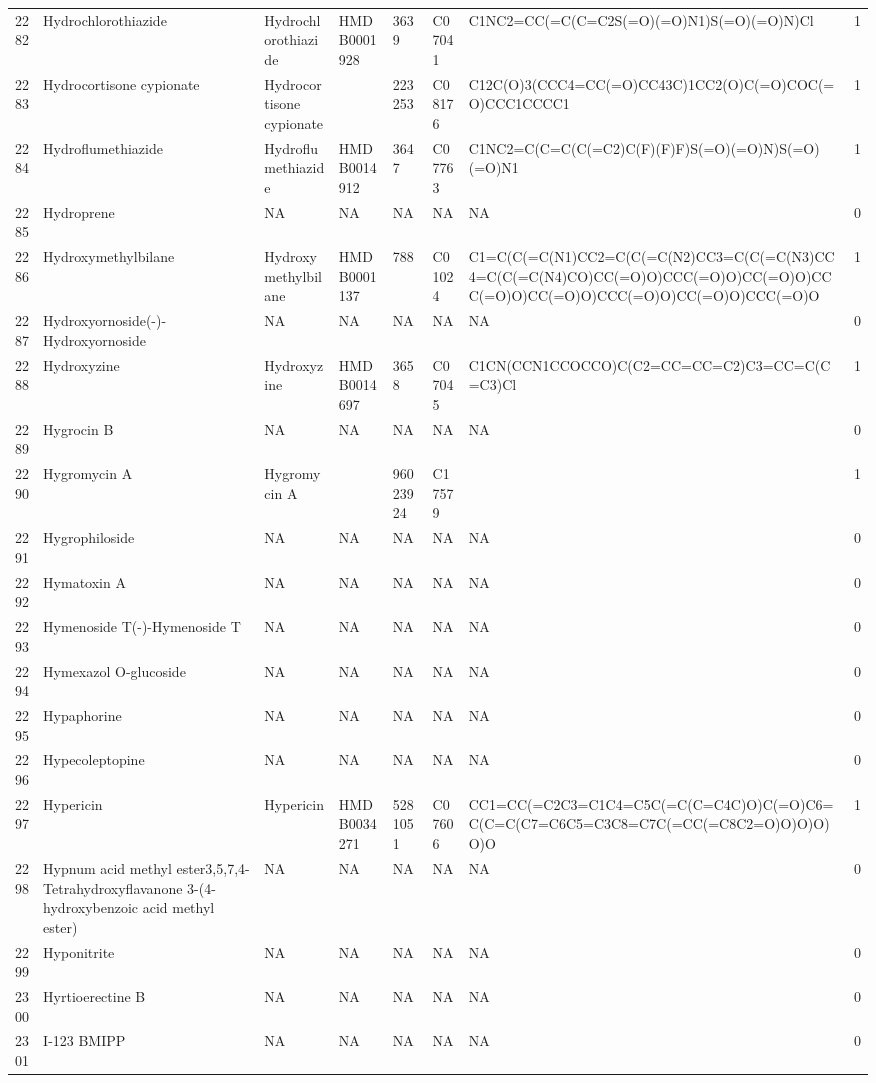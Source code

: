 \documentclass[a4paper]{article}
\begin{document}
\begin{longtable}{rlllllll}
  2282 & Hydrochlorothiazide & Hydrochlorothiazide & HMDB0001928 & 3639 & C07041 & C1NC2=CC(=C(C=C2S(=O)(=O)N1)S(=O)(=O)N)Cl & 1 \\ 
  2283 & Hydrocortisone cypionate & Hydrocortisone cypionate &  & 223253 & C08176 & C12C(O)3(CCC4=CC(=O)CC43C)1CC2(O)C(=O)COC(=O)CCC1CCCC1 & 1 \\ 
  2284 & Hydroflumethiazide & Hydroflumethiazide & HMDB0014912 & 3647 & C07763 & C1NC2=C(C=C(C(=C2)C(F)(F)F)S(=O)(=O)N)S(=O)(=O)N1 & 1 \\ 
  2285 & Hydroprene & NA & NA & NA & NA & NA & 0 \\ 
  2286 & Hydroxymethylbilane & Hydroxymethylbilane & HMDB0001137 & 788 & C01024 & C1=C(C(=C(N1)CC2=C(C(=C(N2)CC3=C(C(=C(N3)CC4=C(C(=C(N4)CO)CC(=O)O)CCC(=O)O)CC(=O)O)CCC(=O)O)CC(=O)O)CCC(=O)O)CC(=O)O)CCC(=O)O & 1 \\ 
  2287 & Hydroxyornoside(-)-Hydroxyornoside & NA & NA & NA & NA & NA & 0 \\ 
  2288 & Hydroxyzine & Hydroxyzine & HMDB0014697 & 3658 & C07045 & C1CN(CCN1CCOCCO)C(C2=CC=CC=C2)C3=CC=C(C=C3)Cl & 1 \\ 
  2289 & Hygrocin B & NA & NA & NA & NA & NA & 0 \\ 
  2290 & Hygromycin A & Hygromycin A &  & 96023924 & C17579 &  & 1 \\ 
  2291 & Hygrophiloside & NA & NA & NA & NA & NA & 0 \\ 
  2292 & Hymatoxin A & NA & NA & NA & NA & NA & 0 \\ 
  2293 & Hymenoside T(-)-Hymenoside T & NA & NA & NA & NA & NA & 0 \\ 
  2294 & Hymexazol O-glucoside & NA & NA & NA & NA & NA & 0 \\ 
  2295 & Hypaphorine & NA & NA & NA & NA & NA & 0 \\ 
  2296 & Hypecoleptopine & NA & NA & NA & NA & NA & 0 \\ 
  2297 & Hypericin & Hypericin & HMDB0034271 & 5281051 & C07606 & CC1=CC(=C2C3=C1C4=C5C(=C(C=C4C)O)C(=O)C6=C(C=C(C7=C6C5=C3C8=C7C(=CC(=C8C2=O)O)O)O)O)O & 1 \\ 
  2298 & Hypnum acid methyl ester3,5,7,4-Tetrahydroxyflavanone 3-(4-hydroxybenzoic acid methyl ester) & NA & NA & NA & NA & NA & 0 \\ 
  2299 & Hyponitrite & NA & NA & NA & NA & NA & 0 \\ 
  2300 & Hyrtioerectine B & NA & NA & NA & NA & NA & 0 \\ 
  2301 & I-123 BMIPP & NA & NA & NA & NA & NA & 0 \\ 

\end{longtable}
\end{document}
